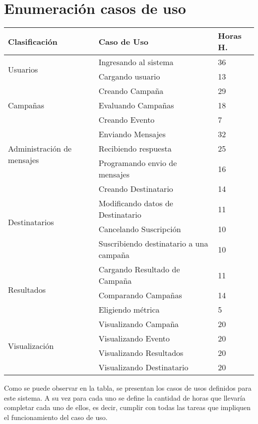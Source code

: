 \documentclass[a4paper, 11pt]{article}
\begin{document}
\newpage
\section{Enumeraci\'on casos de uso}


\begin{table}[H]
\centering
\begin{tabular}{ | p{5cm} | p{8cm} | p{1.5cm} | }
\hline
Clasificación & Caso de Uso & Horas H.\\ \hline \hline
\multirow{2}{5cm}{Usuarios} & Ingresando al sistema & 36 \\ \cline{2-3}
& Cargando usuario & 13 \\ \hline
\multirow{3}{5cm}{Campañas} & Creando Campaña & 29 \\ \cline{2-3}
& Evaluando Campañas & 18 \\ \cline{2-3}
& Creando Evento & 7 \\ \hline
\multirow{3}{5cm}{Administración de mensajes} & Enviando Mensajes & 32 \\ \cline{2-3}
& Recibiendo respuesta & 25 \\ \cline{2-3}
& Programando envio de mensajes & 16 \\ \hline
\multirow{4}{5cm}{Destinatarios} & Creando Destinatario & 14 \\  \cline{2-3}
& Modificando datos de Destinatario & 11 \\ \cline{2-3}
& Cancelando Suscripci\'on & 10 \\ \cline{2-3}
& Suscribiendo destinatario a una campaña & 10 \\ \hline
\multirow{3}{5cm}{Resultados} & Cargando Resultado de Campaña & 11 \\ \cline{2-3}
& Comparando Campañas & 14 \\ \cline{2-3}
& Eligiendo métrica & 5 \\ \hline
\multirow{4}{5cm}{Visualización} & Visualizando Campaña & 20 \\ \cline{2-3}
& Visualizando Evento & 20 \\ \cline{2-3}
& Visualizando Resultados & 20 \\ \cline{2-3}
& Visualizando Destinatario & 20 \\ \hline

\end{tabular}
\end{table}

Como se puede observar en la tabla, se presentan los casos de usos definidos para este sistema. A su vez para cada uno se define la cantidad de horas que llevaría completar cada uno de ellos, es decir, cumplir con todas las tareas que impliquen el funcionamiento del caso de uso.
\end{document}
